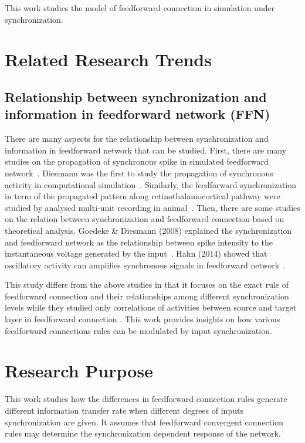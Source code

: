 This work studies the model of feedforward connection in simulation under synchronization.

\section{Related Research Trends}
\subsection{Relationship between synchronization and information in feedforward network (FFN)}

There are many aspects for the relationship between synchronization and information in feedforward network that can be studied. First, there are many studies on the propagation of synchronous spike in simulated feedforward network~\cite{diesmann1999stable, kumar2008conditions,abeles2004modeling}. Diesmann was the first to study the propagation of synchronous activity in computational simulation~\cite{diesmann1999stable}. Similarly, the feedforward synchronization in term of the propagated pattern along retinothalamocortical pathway were studied by analysed multi-unit recording in animal~\cite{neuenschwander2002feed}.
Then, there are some studies on the relation between synchronization and feedforward connection based on theoretical analysis. Goedeke \& Diesmann (2008) explained the synchronization and feedforward network as the relationship between spike intensity to the instantaneous voltage generated by the input~\cite{goedeke2008mechanism}. 
Hahn (2014) showed that oscillatory activity can amplifies synchronous signals in feedforward network~\cite{hahn2014communication}.

This study differs from the above studies in that it focuses on the exact rule of feedforward connection and their relationships among different synchronization levels while they studied only correlations of activities between source and target layer in feedforward connection . This work provides insights on how various feedforward connections rules can be modulated by input synchronization.


\section{Research Purpose}
This work studies how the differences in feedforward connection rules generate different information transfer rate when different degrees of inputs synchronization are given.
It assumes that feedforward convergent connection rules may determine the synchronization dependent response of the network.
